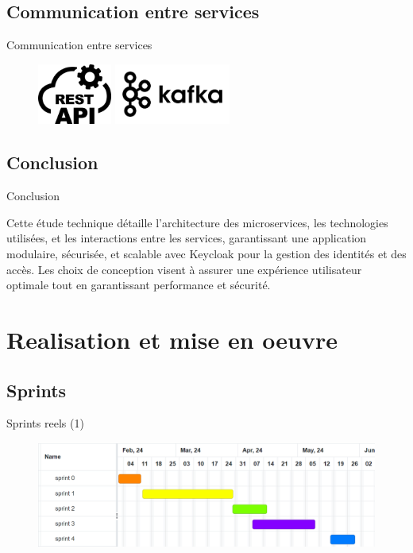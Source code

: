 \documentclass{beamer}
\begin{document}
\subsection{Communication entre services}
\begin{frame}{Communication entre services}
   \begin{figure}[htpb]
        \centering
        \includegraphics[height=2cm]{pic/rest.png}
         \hspace{0.1\textwidth}
         \includegraphics[height=2cm]{pic/kafka.png}
    \end{figure}
\end{frame}

\subsection{Conclusion}
\begin{frame}{Conclusion}

    Cette étude technique détaille l'architecture des microservices, les technologies utilisées, et les interactions entre les services, garantissant une application modulaire, sécurisée, et scalable avec Keycloak pour la gestion des identités et des accès. Les choix de conception visent à assurer une expérience utilisateur optimale tout en garantissant performance et sécurité.
\end{frame}

\section{Realisation et mise en oeuvre}


\subsection{Sprints}
\begin{frame}{Sprints reels (1)}
 
    \begin{figure}[htpb]
           \centering
           \includegraphics[height=3.5cm]{pic/gantt-reel.png}
       \end{figure}
   \end{frame}
\end{document}
